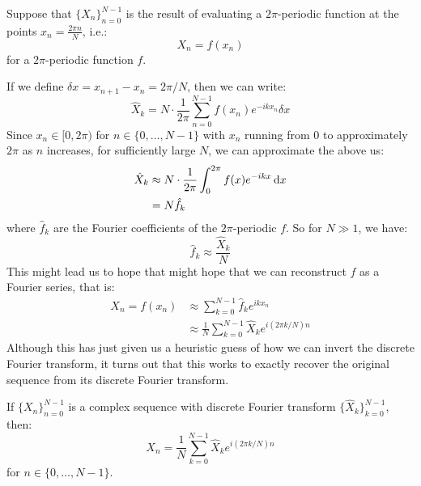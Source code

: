 \documentclass[../main.tex]{subfiles}
\begin{document}
Suppose that $\{X_n\}^{N - 1}_{n = 0}$ is the result of evaluating a $2\pi$-periodic function at the points $x_n = \frac{2\pi n}{N}$, i.e.:
\[
  X_n = f(x_n)
\]
for a $2\pi$-periodic function $f$.

If we define $\delta x = x_{n + 1} - x_n = 2\pi/N$, then we can write:
\[
  \hat{X}_k = N \cdot \frac{1}{2\pi} \sum_{n = 0}^{N - 1} f(x_n) e^{-i k x_n} \delta x
\]
Since $x_n \in [0, 2\pi)$ for $n \in \{0, \ldots, N - 1\}$ with $x_n$ running from 0 to approximately $2\pi$ as $n$ increases, for sufficiently large $N$, we can approximate the above us:
\begin{align*}
  \hat{X}_k &\approx N \cdot \frac{1}{2\pi} \int_{0}^{2\pi} f(x) e^{-ikx} \d{x} \\
            &= N \hat{f}_k
\end{align*}
where $\hat{f}_k$ are the Fourier coefficients of the $2\pi$-periodic $f$.
So for $N \gg 1$, we have:
\[
  \hat{f}_k \approx \frac{\hat{X}_k}{N}
\]
This might lead us to hope that might hope that we can reconstruct $f$ as a Fourier series, that is:
\begin{align*}
  X_n = f(x_n) &\approx \sum_{k = 0}^{N - 1} \hat{f}_ke^{ikx_n} \\
               &\approx \frac{1}{N} \sum_{k = 0}^{N - 1} \hat{X}_k e^{i(2 \pi k/N)n}
\end{align*}
Although this has just given us a heuristic guess of how we can invert the discrete Fourier transform, it turns out that this works to exactly recover the original sequence from its discrete Fourier transform.
\begin{proposition}
  If $\{X_n\}^{N - 1}_{n = 0}$ is a complex sequence with discrete Fourier transform $\{\hat{X}_k\}^{N - 1}_{k = 0}$, then: \label{invDFT}
  \[
    X_n = \frac{1}{N} \sum_{k = 0}^{N - 1} \hat{X}_k e^{i(2 \pi k/N)n}
  \]
  for $n \in \{0,\ldots, N - 1\}$.
\end{proposition}
\end{document}
